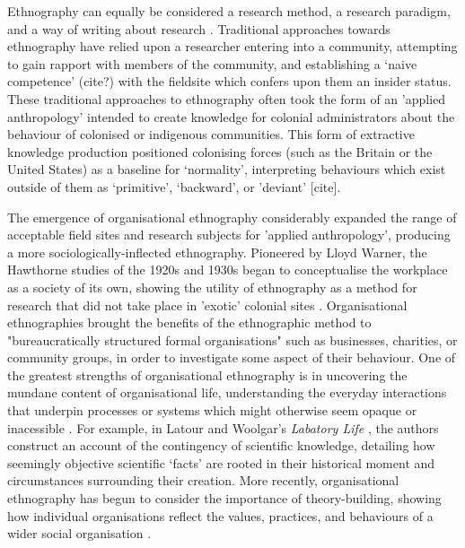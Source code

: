 Ethnography can equally be considered a research method, a research paradigm, and a way of writing about research \cite{bate_whatever_1997}. Traditional approaches towards ethnography have relied upon a researcher entering into a community, attempting to gain rapport with members of the community, and establishing a ‘naive competence’ (cite?) with the fieldsite which confers upon them an insider status.  These traditional approaches to ethnography often took the form of an 'applied anthropology' intended to create knowledge for colonial administrators about the behaviour of colonised or indigenous communities\cite{baba_end_2005}.  This form of extractive knowledge production positioned colonising forces (such as the Britain or the United States) as a baseline for ‘normality’, interpreting behaviours which exist outside of them as ‘primitive’, ‘backward’, or 'deviant' [cite]. 

The emergence of organisational ethnography considerably expanded the range of acceptable field sites and research subjects for 'applied anthropology', producing a more sociologically-inflected ethnography. Pioneered by Lloyd Warner, the Hawthorne studies of the 1920s and 1930s began to conceptualise the workplace as a society of its own, showing the utility of ethnography as a method for research that did not take place in 'exotic' colonial sites \cite{neyland_organizational_2007}. Organisational ethnographies brought the benefits of the ethnographic method to "bureaucratically structured formal organisations" \cite{watson_making_2012} such as businesses, charities, or community groups, in order to investigate some aspect of their behaviour. One of the greatest strengths of organisational ethnography is in uncovering the mundane content of organisational life, understanding the everyday interactions that underpin processes or systems which might otherwise seem opaque or inacessible \cite{bate_whatever_1997}. For example, in Latour and Woolgar's \textit{Labatory Life} \cite{latour_laboratory_1986}, the authors construct an account of the contingency of scientific knowledge, detailing how seemingly objective scientific ‘facts’ are rooted in their historical moment and circumstances surrounding their creation. More recently, organisational ethnography has begun to consider the importance of theory-building, showing how individual organisations reflect the values, practices, and behaviours of a wider social organisation \cite{watson_making_2012}. 

